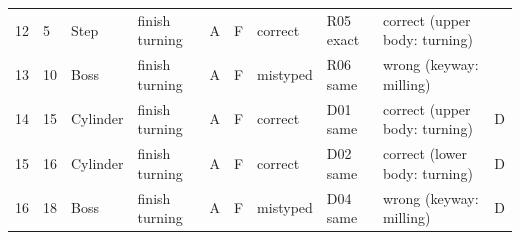 \begin{table}[htbp]
{\begin{tabular}{p{0.45cm} p{0.55cm} p{1.5cm} p{1.5cm} p{0.4cm} p{0.4cm} p{1.1cm} p{1.4cm} p{3.6cm} p{0.6cm}}
12 & 5 & Step & finish turning & A & F & correct & R05 exact & correct (upper body: turning) &  \\
13 & 10 & Boss & finish turning & A & F & mistyped & R06 same & wrong (keyway: milling) &  \\
14 & 15 & Cylinder & finish turning & A & F & correct & D01 same & correct (upper body: turning) & D \\
15 & 16 & Cylinder & finish turning & A & F & correct & D02 same & correct (lower body: turning) & D \\
16 & 18 & Boss & finish turning & A & F & mistyped & D04 same & wrong (keyway: milling) & D \\
\bottomrule
\end{tabular}}
\end{table}

